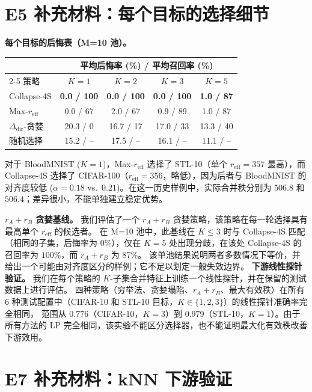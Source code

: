 \documentclass{article}
\newcommand{\reff}{\ensuremath{r_{\mathrm{eff}}}\xspace}
\newcommand{\Ddir}{\ensuremath{\Delta_{\mathrm{dir}}}\xspace}
\begin{document}
\section{E5 补充材料：每个目标的选择细节}
\label{app:e5_downstream}

\textbf{每个目标的后悔表（M=10 池）。}
\begin{center}
\setlength{\tabcolsep}{5pt}
\begin{tabular}{lcccc}
\toprule
& \multicolumn{4}{c}{平均后悔率 (\%) / 平均召回率 (\%)} \\
\cmidrule(lr){2-5}
策略 & $K{=}1$ & $K{=}2$ & $K{=}3$ & $K{=}5$ \\
\midrule
Collapse-4S & \textbf{0.0 / 100} & \textbf{0.0 / 100} & \textbf{0.0 / 100} & \textbf{1.0 / 87} \\
Max-$\reff$ & 0.0 / 67 & 2.0 / 67 & 0.9 / 89 & 1.0 / 87 \\
$\Ddir$-贪婪 & 20.3 / 0 & 16.7 / 17 & 17.0 / 33 & 13.3 / 40 \\
随机选择 & 15.2 / -- & 17.5 / -- & 16.1 / -- & 11.1 / -- \\
\bottomrule
\end{tabular}
\end{center}

对于 BloodMNIST ($K{=}1$)，Max-$\reff$ 选择了 STL-10（单个 $\reff{=}357$ 最高），而 Collapse-4S 选择了 CIFAR-100（$\reff{=}356$，略低），因为后者与 BloodMNIST 的对齐度较低 ($\alpha{=}0.18$ vs.\ $0.21$)。在这一历史样例中，实际合并秩分别为 $506.8$ 和 $506.4$；差异很小，不能单独建立稳定优势。

\textbf{$r_A{+}r_B$ 贪婪基线。}
我们评估了一个 $r_A{+}r_B$ 贪婪策略，该策略在每一轮选择具有最高单个 $\reff$ 的候选者。
在 M=10 池中，此基线在 $K{\leq}3$ 时与 Collapse-4S 匹配（相同的子集，后悔率为 $0\%$），仅在 $K{=}5$ 处出现分歧，在该处 Collapse-4S 的召回率为 $100\%$，而 $r_A{+}r_B$ 为 $87\%$。
该单池结果说明两者多数情况下等价，并给出一个可能由对齐度区分的样例；它不足以划定一般失效边界。
\textbf{下游线性探针验证。}
我们在每个策略的 $K$-子集合并特征上训练一个线性探针，并在保留的测试数据上进行评估。
四种策略（穷举法、贪婪塌陷、$r_A+r_B$、最大有效秩）在所有 6 种测试配置中（CIFAR-10 和 STL-10 目标，$K{\in}\{1,2,3\}$）的线性探针准确率完全相同，
范围从 $0.776$（CIFAR-10，$K{=}3$）到 $0.979$（STL-10，$K{=}1$）。由于所有方法的 LP 完全相同，该实验不能区分选择器，也不能证明最大化有效秩改善下游效用。

\section{E7 补充材料：kNN 下游验证}
\label{app:e7_knn}
\end{document}
